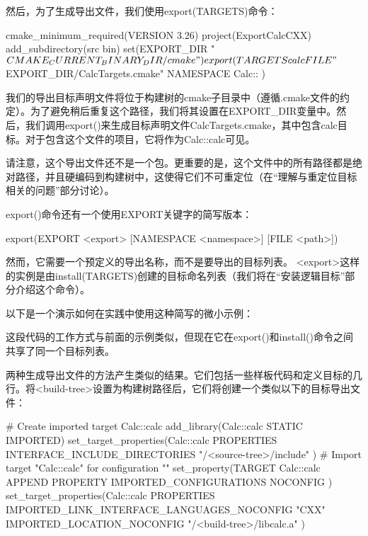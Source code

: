 然后，为了生成导出文件，我们使用export(TARGETS)命令：


\begin{cmake}
cmake_minimum_required(VERSION 3.26)
project(ExportCalcCXX)
add_subdirectory(src bin)
set(EXPORT_DIR "${CMAKE_CURRENT_BINARY_DIR}/cmake")
export(TARGETS calc
    FILE "${EXPORT_DIR}/CalcTargets.cmake"
    NAMESPACE Calc::
)
\end{cmake}

我们的导出目标声明文件将位于构建树的cmake子目录中（遵循.cmake文件的约定）。为了避免稍后重复这个路径，我们将其设置在EXPORT\_DIR变量中。然后，我们调用export()来生成目标声明文件CalcTargets.cmake，其中包含calc目标。对于包含这个文件的项目，它将作为Calc::calc可见。

请注意，这个导出文件还不是一个包。更重要的是，这个文件中的所有路径都是绝对路径，并且硬编码到构建树中，这使得它们不可重定位（在“理解与重定位目标相关的问题”部分讨论）。

export()命令还有一个使用EXPORT关键字的简写版本：

\begin{shell}
export(EXPORT <export> [NAMESPACE <namespace>] [FILE <path>])
\end{shell}

然而，它需要一个预定义的导出名称，而不是要导出的目标列表。 <export>这样的实例是由install(TARGETS)创建的目标命名列表（我们将在“安装逻辑目标”部分介绍这个命令）。

以下是一个演示如何在实践中使用这种简写的微小示例：



这段代码的工作方式与前面的示例类似，但现在它在export()和install()命令之间共享了同一个目标列表。

两种生成导出文件的方法产生类似的结果。它们包括一些样板代码和定义目标的几行。将<build-tree>设置为构建树路径后，它们将创建一个类似以下的目标导出文件：


\begin{cmake}
# Create imported target Calc::calc
add_library(Calc::calc STATIC IMPORTED)
set_target_properties(Calc::calc PROPERTIES
    INTERFACE_INCLUDE_DIRECTORIES
    "/<source-tree>/include"
)
# Import target "Calc::calc" for configuration ""
set_property(TARGET Calc::calc APPEND PROPERTY
    IMPORTED_CONFIGURATIONS NOCONFIG
)
set_target_properties(Calc::calc PROPERTIES
    IMPORTED_LINK_INTERFACE_LANGUAGES_NOCONFIG "CXX"
    IMPORTED_LOCATION_NOCONFIG "/<build-tree>/libcalc.a"
)
\end{cmake}

